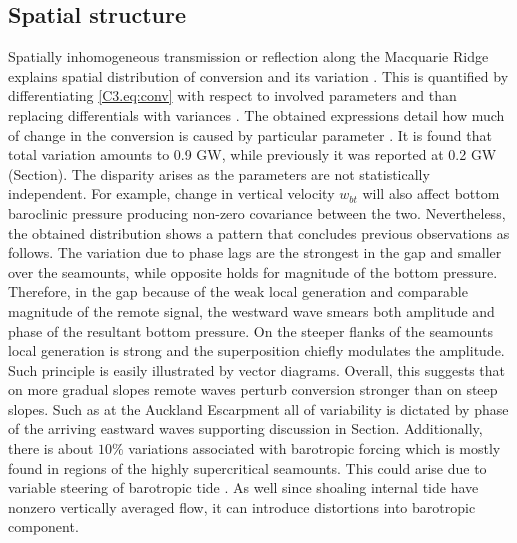 \documentclass[12pt]{article}
\begin{document}
\subsection{Spatial structure}
Spatially inhomogeneous transmission or reflection along the Macquarie Ridge explains spatial 
distribution of conversion and its variation . This is quantified by 
differentiating 
\eqref{C3.eq:conv} with respect to involved parameters and than replacing differentials with 
variances \citep{kerry2014impact}. The obtained expressions detail how much of change in the 
conversion is caused by particular parameter . It is found that total 
variation 
amounts to 0.9 GW, while previously it was reported at 0.2 GW (Section). The disparity arises as 
the parameters are not statistically independent. For example, change in vertical velocity $w_{bt}$ 
will also affect bottom baroclinic pressure producing non-zero covariance between the two. 
Nevertheless, the obtained distribution shows a pattern that concludes previous observations as 
follows. The variation due to phase lags are the strongest in the gap and smaller over the 
seamounts, while opposite holds for magnitude of the bottom pressure. Therefore, in the gap because 
of the weak local generation and comparable magnitude of the remote signal, the westward wave  
smears both amplitude and phase of the resultant bottom pressure. On the steeper flanks of the 
seamounts local generation is strong and the superposition chiefly modulates the amplitude. Such 
principle is easily illustrated by vector diagrams. Overall, this suggests that on more gradual 
slopes remote waves perturb conversion stronger than on steep slopes. Such as at the Auckland 
Escarpment 
all of variability is dictated by phase of the arriving eastward waves 
supporting discussion in Section. Additionally, there is about $10\%$ variations associated with 
barotropic forcing which is mostly found in regions of the highly supercritical seamounts. This 
could arise due to variable steering of barotropic tide \citep{holloway1999internal}. As well since 
shoaling internal tide have nonzero vertically averaged flow, it can introduce distortions into 
barotropic component.\\
\end{document}
